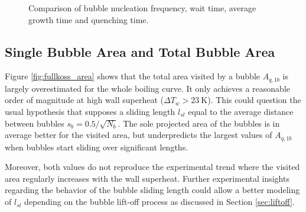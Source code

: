 \begin{figure}[!h]
\caption{Comparison of bubble nucleation frequency, wait time, average growth time and quenching time.}
\label{fig:fullkoss_times}
\end{figure}





\subsection{Single Bubble Area and Total Bubble Area}

Figure \ref{fig:fullkoss_area} shows that the total area visited by a bubble  $A_{q,1b}$ is largely overestimated for the whole boiling curve. It only achieves a reasonable order of magnitude at high wall superheat ($\Delta T_{w} > 23\ $K). This could question the usual hypothesis that supposes a sliding length $l_{sl}$ equal to the average distance between bubbles $s_{b} = 0.5/\sqrt{N_{b}}$. The sole projected area of the bubbles is in average better for the visited area, but underpredicts the largest values of $A_{q,1b}$ when bubbles start sliding over significant lengths.

\npar

Moreover, both values do not reproduce the experimental trend where the visited area regularly increases with the wall superheat. Further experimental insights regarding the behavior of the bubble sliding length could allow a better modeling of $l_{sl}$ depending on the bubble lift-off process as discussed in Section \ref{sec:liftoff}.


